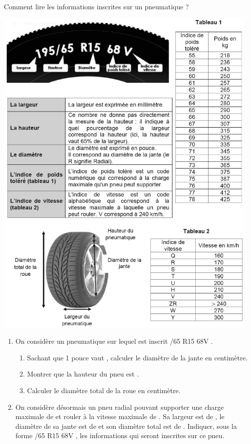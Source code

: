 {\begin{exercice}[CRPE 2018 G1] %
   Comment lire les informations inscrites sur un pneumatique ?
   \begin{center}
      \includegraphics[width=13cm]{Grandeurs_mesures/Images/M13_ex_pneu}
   \end{center}
      \begin{enumerate}
         \item On considère un pneumatique sur lequel est inscrit /65 R15 68V \fg.
         \begin{enumerate}
            \item Sachant que 1 pouce vaut , calculer le diamètre de la jante en centimètre.
            \item Montrer que la hauteur du pneu est .
            \item Calculer le diamètre total de la roue en centimètre.
         \end{enumerate}
      \item On considère désormais un pneu radial pouvant supporter une charge maximale de  et rouler à la vitesse maximale de . Sa largeur est de , le diamètre de sa jante est de  et son diamètre total est de . Indiquer, sous la forme /65 R15 68V \fg, les informations qui seront inscrites sur ce pneu.
   \end{enumerate}
\end{exercice}

}
